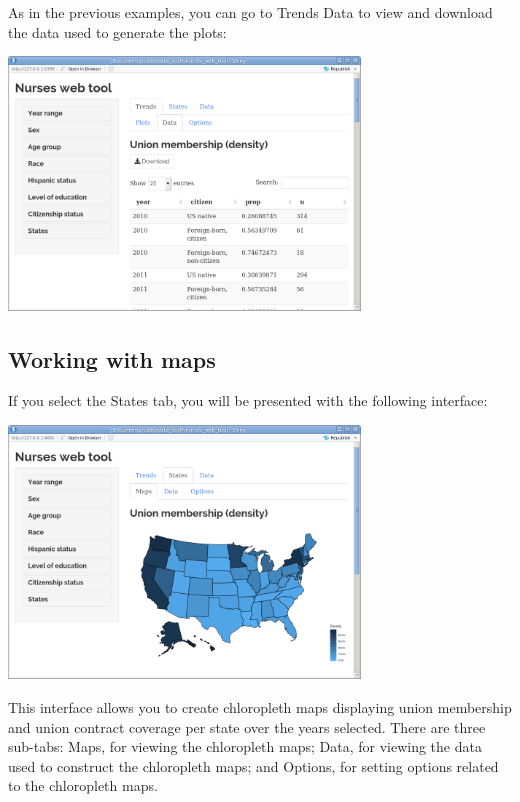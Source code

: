 \documentclass[letterpaper,12pt]{article}
\begin{document}
\begin{enumerate}
  As in the previous examples, you can go to Trends \textrightarrow{}
  Data to view and download the data used to generate the plots:
  \begin{center}
    \includegraphics[width=0.7\textwidth]{images/trends_ex3/data_interface.png}
  \end{center}

\end{enumerate}

\subsection{Working with maps}

If you select the States tab, you will be presented with the following
interface:

\begin{center}
  \includegraphics[width=0.7\textwidth]{images/states_interface.png}
\end{center}

This interface allows you to create chloropleth maps displaying union
membership and union contract coverage per state over the years
selected. There are three sub-tabs: Maps, for viewing the chloropleth
maps; Data, for viewing the data used to construct the chloropleth
maps; and Options, for setting options related to the chloropleth
maps.
\end{document}
